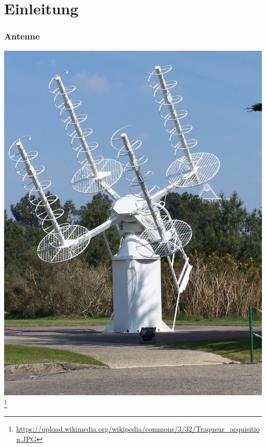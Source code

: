 

\subtitle{Technik 11: \\
           Antennentechnik \\[2em]}
\date{Stand 30.11.2014}




\section*{Einleitung}

\begin{frame}
    \frametitle{Antenne}
      \begin{center}
        \includegraphics[width=.38\textwidth]{e11/Traqueur_acquisition.JPG}
        \footnote{\tiny \url{https://upload.wikimedia.org/wikipedia/commons/3/32/Traqueur_acquisition.JPG}}
    \end{center}
\end{frame}
  
